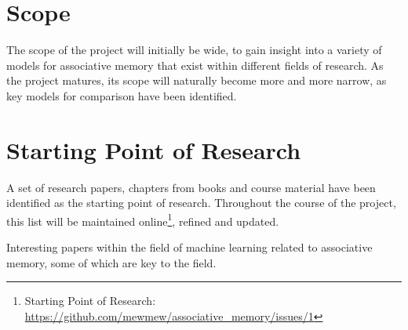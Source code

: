 \documentclass[12pt, a4paper]{article}
\begin{document}
\section{Scope}


The scope of the project will initially be wide, to gain insight into a variety of models for associative memory that exist within different fields of research. As the project matures, its scope will naturally become more and more narrow, as key models for comparison have been identified.

\section{Starting Point of Research}

A set of research papers, chapters from books and course material have been identified as the starting point of research. Throughout the course of the project, this list will be maintained online\footnote{Starting Point of Research: \url{https://github.com/mewmew/associative_memory/issues/1}}, refined and updated.

Interesting papers within the field of machine learning related to associative memory, some of which are key to the field.
\end{document}
